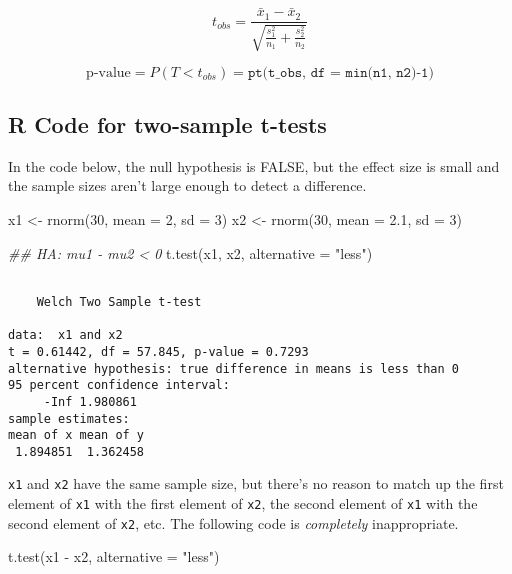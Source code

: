 \documentclass[
  letterpaper,
  DIV=11,
  numbers=noendperiod]{scrreprt}
\newenvironment{Shaded}{\begin{snugshade}}{\end{snugshade}}
\newcommand{\AttributeTok}[1]{\textcolor[rgb]{0.40,0.45,0.13}{#1}}
\newcommand{\DecValTok}[1]{\textcolor[rgb]{0.68,0.00,0.00}{#1}}
\newcommand{\DocumentationTok}[1]{\textcolor[rgb]{0.37,0.37,0.37}{\textit{#1}}}
\newcommand{\FloatTok}[1]{\textcolor[rgb]{0.68,0.00,0.00}{#1}}
\newcommand{\FunctionTok}[1]{\textcolor[rgb]{0.28,0.35,0.67}{#1}}
\newcommand{\NormalTok}[1]{\textcolor[rgb]{0.00,0.23,0.31}{#1}}
\newcommand{\OtherTok}[1]{\textcolor[rgb]{0.00,0.23,0.31}{#1}}
\newcommand{\SpecialCharTok}[1]{\textcolor[rgb]{0.37,0.37,0.37}{#1}}
\newcommand{\StringTok}[1]{\textcolor[rgb]{0.13,0.47,0.30}{#1}}
\begin{document}
\[t_{obs} = \frac{\bar x_1 - \bar x_2}{\sqrt{\frac{s_1^2}{n_1} + \frac{s_2^2}{n_2}}}\]\vspace{-12mm}

\[
\text{p-value} = P(T < t_{obs}) = \texttt{pt(t\_obs, df = min(n1, n2)-1)}
\]

\hypertarget{r-code-for-two-sample-t-tests}{%
\subsection{R Code for two-sample
t-tests}\label{r-code-for-two-sample-t-tests}}

In the code below, the null hypothesis is FALSE, but the effect size is
small and the sample sizes aren't large enough to detect a difference.

\begin{Shaded}
\begin{Highlighting}[]
\NormalTok{x1 }\OtherTok{\textless{}{-}} \FunctionTok{rnorm}\NormalTok{(}\DecValTok{30}\NormalTok{, }\AttributeTok{mean =} \DecValTok{2}\NormalTok{, }\AttributeTok{sd =} \DecValTok{3}\NormalTok{)}
\NormalTok{x2 }\OtherTok{\textless{}{-}} \FunctionTok{rnorm}\NormalTok{(}\DecValTok{30}\NormalTok{, }\AttributeTok{mean =} \FloatTok{2.1}\NormalTok{, }\AttributeTok{sd =} \DecValTok{3}\NormalTok{)}

\DocumentationTok{\#\# HA: mu1 {-} mu2 \textless{} 0}
\FunctionTok{t.test}\NormalTok{(x1, x2, }\AttributeTok{alternative =} \StringTok{"less"}\NormalTok{) }
\end{Highlighting}
\end{Shaded}

\begin{verbatim}

    Welch Two Sample t-test

data:  x1 and x2
t = 0.61442, df = 57.845, p-value = 0.7293
alternative hypothesis: true difference in means is less than 0
95 percent confidence interval:
     -Inf 1.980861
sample estimates:
mean of x mean of y 
 1.894851  1.362458 
\end{verbatim}

\texttt{x1} and \texttt{x2} have the same sample size, but there's no
reason to match up the first element of \texttt{x1} with the first
element of \texttt{x2}, the second element of \texttt{x1} with the
second element of \texttt{x2}, etc. The following code is
\emph{completely} inappropriate.

\begin{Shaded}
\begin{Highlighting}[]
\FunctionTok{t.test}\NormalTok{(x1 }\SpecialCharTok{{-}}\NormalTok{ x2, }\AttributeTok{alternative =} \StringTok{"less"}\NormalTok{)}
\end{Highlighting}
\end{Shaded}
\end{document}
